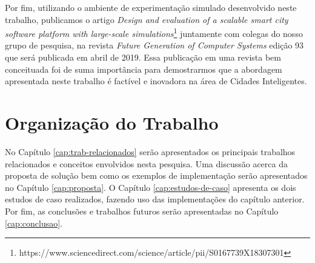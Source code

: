 Por fim, utilizando o ambiente de experimentação simulado desenvolvido neste trabalho, publicamos o artigo \textit{Design and evaluation of a scalable smart city software platform with
large-scale simulations}\footnote{https://www.sciencedirect.com/science/article/pii/S0167739X18307301} juntamente com colegas do nosso grupo de pesquisa, na revista \textit{Future Generation of
Computer Systems} edição 93 que será publicada em abril de 2019.  
Essa publicação em uma revista bem conceituada foi de suma importância para demostrarmos que a abordagem apresentada neste trabalho é factível e inovadora na área de Cidades Inteligentes.

\section{Organização do Trabalho}

No Capítulo \ref{cap:trab-relacionados} serão apresentados os principais trabalhos relacionados e conceitos envolvidos nesta pesquisa.
Uma discussão acerca da proposta de solução bem como os exemplos de implementação serão apresentados no Capítulo \ref{cap:proposta}.
O Capítulo \ref{cap:estudos-de-caso} apresenta os dois estudos de caso realizados, fazendo uso das implementações do capítulo anterior.
Por fim, as conclusões e trabalhos futuros serão apresentadas no Capítulo \ref{cap:conclusao}.

